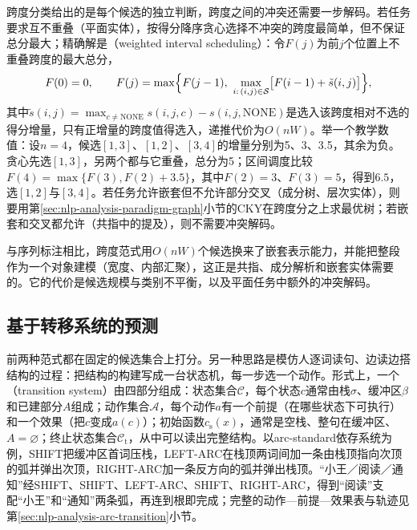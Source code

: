跨度分类给出的是每个候选的独立判断，跨度之间的冲突还需要一步解码。若任务要求互不重叠（平面实体），按得分降序贪心选择不冲突的跨度最简单，但不保证总分最大；精确解是（weighted interval scheduling）：令$F(j)$为前$j$个位置上不重叠跨度的最大总分，
\[
  F(0)=0,\qquad F(j)=\max\Bigl\{F(j-1),\ \max_{i:\,(i,j)\in\mathcal S}\bigl[F(i-1)+\tilde s(i,j)\bigr]\Bigr\},
\]
其中$\tilde s(i,j)=\max_{c\neq\mathrm{NONE}}s(i,j,c)-s(i,j,\mathrm{NONE})$是选入该跨度相对不选的得分增量，只有正增量的跨度值得选入，递推代价为$O(nW)$。举一个教学数值：设$n=4$，候选$[1,3]$、$[1,2]$、$[3,4]$的增量分别为5、3、3.5，其余为负。贪心先选$[1,3]$，另两个都与它重叠，总分为5；区间调度比较$F(4)=\max\{F(3),F(2)+3.5\}$，其中$F(2)=3$、$F(3)=5$，得到$6.5$，选$[1,2]$与$[3,4]$。若任务允许嵌套但不允许部分交叉（成分树、层次实体），则要用第\ref{sec:nlp-analysis-paradigm-graph}小节的CKY在跨度分之上求最优树；若嵌套和交叉都允许（共指中的提及），则不需要冲突解码。

与序列标注相比，跨度范式用$O(nW)$个候选换来了嵌套表示能力，并能把整段作为一个对象建模（宽度、内部汇聚），这正是共指、成分解析和嵌套实体需要的。它的代价是候选规模与类别不平衡，以及平面任务中额外的冲突解码。

\subsection{基于转移系统的预测}
\label{sec:nlp-analysis-paradigm-transition}

前两种范式都在固定的候选集合上打分。另一种思路是模仿人逐词读句、边读边搭结构的过程：把结构的构建写成一台状态机，每一步选一个动作。形式上，一个（transition system）由四部分组成：状态集合$\mathcal C$，每个状态$c$通常由栈$\sigma$、缓冲区$\beta$和已建部分$A$组成；动作集合$\mathcal A$，每个动作$a$有一个前提（在哪些状态下可执行）和一个效果（把$c$变成$a(c)$）；初始函数$c_{\mathrm s}(x)$，通常是空栈、整句在缓冲区、$A=\varnothing$；终止状态集合$\mathcal C_{\mathrm t}$，从中可以读出完整结构。以arc-standard依存系统为例，SHIFT把缓冲区首词压栈，LEFT-ARC在栈顶两词间加一条由栈顶指向次顶的弧并弹出次顶，RIGHT-ARC加一条反方向的弧并弹出栈顶。“小王／阅读／通知”经SHIFT、SHIFT、LEFT-ARC、SHIFT、RIGHT-ARC，得到“阅读”支配“小王”和“通知”两条弧，再连到根即完成；完整的动作—前提—效果表与轨迹见第\ref{sec:nlp-analysis-arc-transition}小节。

